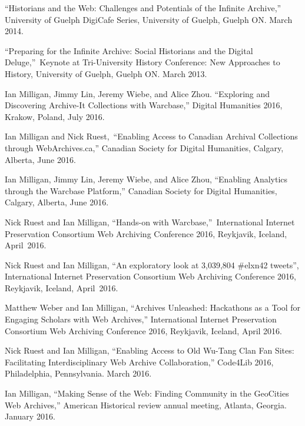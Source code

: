\documentclass[11pt,article,oneside]{memoir}
\begin{document}
\ind ``Historians and the Web: Challenges and Potentials of the Infinite Archive,'' University of Guelph DigiCafe Series, University of Guelph, Guelph ON. March 2014.

\ind ``Preparing for the Infinite Archive: Social Historians and the Digital Deluge,'' Keynote at Tri-University History Conference: New Approaches to History, University of Guelph, Guelph ON. March 2013.


\bigskip


\medskip

\ind Ian Milligan, Jimmy Lin, Jeremy Wiebe, and Alice Zhou. ``Exploring and Discovering Archive-It Collections with Warcbase,'' Digital Humanities 2016, Krakow, Poland, July 2016.

\ind Ian Milligan and Nick Ruest, ``Enabling Access to Canadian Archival Collections through WebArchives.ca,'' Canadian Society for Digital Humanities, Calgary, Alberta, June 2016. 

\ind Ian Milligan, Jimmy Lin, Jeremy Wiebe, and Alice Zhou, ``Enabling Analytics through the Warcbase Platform,'' Canadian Society for Digital Humanities, Calgary, Alberta, June 2016.

\ind Nick Ruest and Ian Milligan, ``Hands-on with Warcbase,'' International Internet Preservation Consortium Web Archiving Conference 2016, Reykjavik, Iceland, April 2016.

\ind Nick Ruest and Ian Milligan, ``An exploratory look at 3,039,804 \#elxn42 tweets'', International Internet Preservation Consortium Web Archiving Conference 2016, Reykjavik, Iceland, April 2016.

\ind Matthew Weber and Ian Milligan, ``Archives Unleashed: Hackathons as a Tool for Engaging Scholars with Web Archives,'' International Internet Preservation Consortium Web Archiving Conference 2016, Reykjavik, Iceland, April 2016.

\ind Nick Ruest and Ian Milligan, ``Enabling Access to Old Wu-Tang Clan Fan Sites: Facilitating Interdisciplinary Web Archive Collaboration,'' Code4Lib 2016, Philadelphia, Pennsylvania. March 2016. 

\ind Ian Milligan, ``Making Sense of the Web: Finding Community in the GeoCities Web Archives,'' American Historical review annual meeting, Atlanta, Georgia. January 2016. 
\end{document}
